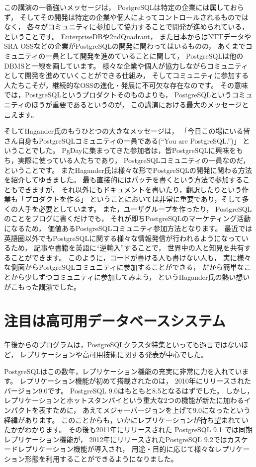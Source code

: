 この講演の一番強いメッセージは，
PostgreSQLは特定の企業には属しておらず，
そしてその開発は特定の企業や個人によってコントロールされるものではなく，
各々がコミュニティに参加して協力することで開発が進められている，
ということです。
EnterpriseDBや2ndQuadrant，
また日本からはNTTデータやSRA OSSなどの企業がPostgreSQLの開発に関わってはいるものの，
あくまでコミュニティの一員として開発を進めていることに関して，
PostgreSQLは他のDBMSと一線を画しています。
様々な企業や個人が協力しながらコミュニティとして開発を進めていくことができる仕組み，
そしてコミュニティに参加する人たちこそが，継続的なOSSの進化・発展に不可欠な存在なのです。
その意味では，PostgreSQLというプロダクトそのものよりも，
PostgreSQLというコミュニティのほうが重要であるというのが，
この講演における最大のメッセージと言えます。

そしてHagander氏のもうひとつの大きなメッセージは，
「今日この場にいる皆さん自身もPostgreSQLコミュニティの一員である(``You are PostgreSQL.'')」
ということでした。
PgDayに集まってきた参加者は，皆PostgreSQLに興味をもち，実際に使っている人たちであり，
PostgreSQLコミュニティの一員なのだ，ということです。
またHagander氏は様々な形でPostgreSQLの開発に関わる方法を紹介してゆきました。
最も直接的にはパッチを書くという方法で参加することもできますが，
それ以外にもドキュメントを書いたり，翻訳したりという作業も「プロダクトを作る」
ということにおいては非常に重要であり，そして多くの人手を必要としています。
また，ユーザグループを作ったり，
PostgreSQLのことをブログに書くだけでも，
それが即ちPostgreSQLのマーケティング活動になるため，
価値あるPostgreSQLコミュニティ参加方法となります。
最近では英語圏以外でもPostgreSQLに関する様々な情報発信が行われるようになっているため，
記事や書籍を英語に``逆輸入''することで，
世界中の人と知見を共有することができます。
このように，コードが書ける人も書けない人も，
実に様々な側面からPostgreSQLコミュニティに参加することができる，
だから簡単なことから少しずつコミュニティに参加してみよう，
というHagander氏の熱い想いがこもった講演でした。

\section{注目は高可用データベースシステム}

午後からのプログラムは，PostgreSQLクラスタ特集といっても過言ではないほど，
レプリケーションや高可用技術に関する発表が中心でした。

PostgreSQLはこの数年，レプリケーション機能の充実に非常に力を入れています。
レプリケーション機能が初めて搭載されたのは，
2010年にリリースされたバージョン9.0です。
PostgreSQL 9.0はもともと8.5となるはずでした。
しかし，レプリケーションとホットスタンバイという重大な2つの機能が新たに加わるインパクトを表すために，
あえてメジャーバージョンを上げて9.0になったという経緯があります。
このことからも，いかにレプリケーションが待ち望まれていたかがわかります。
その後も2011年にリリースされた PostgreSQL 9.1 では同期レプリケーション機能が，
2012年にリリースされたPostgreSQL 9.2ではカスケードレプリケーション機能が導入され，
用途・目的に応じて様々なレプリケーション形態を利用することができるようになりました。

